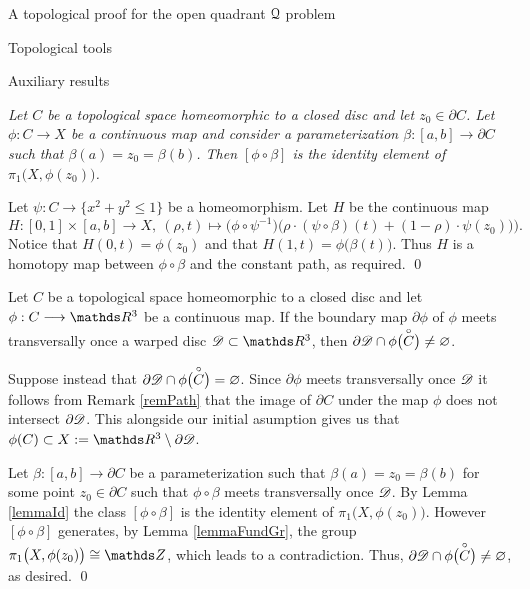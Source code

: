 \documentclass[11pt, a4paper, english, twoside, notitlepage, openright]{report}
\begin{document}
\begin{chapter}{A topological proof for the open quadrant $\mathcal{Q}$ problem}
\begin{section}{Topological tools}
\begin{subsection}{Auxiliary results}
\begin{lemma}\label{lemmaId} \em Let $C$ be a topological space homeomorphic to a closed disc and let $z_0\in\partial C$. Let $\phi:C\longrightarrow X$ be a continuous map and consider a parameterization $\beta:[a,b]\to\partial C$ such that $\beta(a)=z_0=\beta(b)$. Then $[\phi\circ\beta]$ is the identity element of $\pi_1\big(X,\phi(z_0)\big)$.\em
\begin{Proof} 
Let $\psi:C\to\{x^2+y^2\leq 1\}$ be a homeomorphism. Let $H$ be the continuous map
$$
H:[0,1]\times[a,b]\to X,\ (\rho,t)\mapsto\big(\phi\circ\psi^{-1}\big)\big(\rho\cdot(\psi\circ\beta)(t)+(1-\rho)\cdot\psi(z_0))\big).
$$
Notice that $H(0,t)=\phi(z_0)$ and that $H(1,t)=\phi\big(\beta(t)\big)$. Thus $H$ is a homotopy map between $\phi\circ\beta$ and the constant path, as required.
\qed
\end{Proof}
\end{lemma}

\begin{proposition}\label{propTop}
Let $C$ be a topological space homeomorphic to a closed disc and let $\phi:C\longrightarrow\R^3$ be a continuous map. If the boundary map $\partial\phi$ of $\phi$ meets transversally once a warped disc $\D\subset\R^3$, then $\partial\mathscr{D}\cap\phi\big(\overset{\circ}{C}\big)\neq\varnothing$.
\begin{Proof}
Suppose instead that $\partial\mathscr{D}\cap\phi\big(\overset{\circ}{C}\big)=\varnothing$. Since $\partial\phi$ meets transversally once $\mathscr{D}$ it follows from Remark \ref{remPath} that the image of $\partial C$ under the map $\phi$ does not intersect $\partial\mathscr{D}$. This alongside our initial asumption gives us that $\phi(C)\subset X:=\R^3\setminus\partial\D$.

\vspace{1mm}

Let $\beta:[a,b]\to\partial C$ be a parameterization such that $\beta(a)=z_0=\beta(b)$ for some point $z_0\in\partial C$ such that $\phi\circ\beta$ meets transversally once $\mathscr{D}$. By Lemma \ref{lemmaId} the class $[\phi\circ\beta]$ is the identity element of $\pi_1\big(X,\phi(z_0)\big)$. However $[\phi\circ\beta]$ generates, by Lemma \ref{lemmaFundGr}, the group $\pi_1\big(X,\phi(z_0)\big)\cong\Z$, which leads to a contradiction. Thus, $\partial\mathscr{D}\cap\phi\big(\overset{\circ}{C}\big)\neq\varnothing$, as desired.
\qed
\end{Proof}
\end{proposition}
\end{subsection}
\end{section}


\end{chapter}
\end{document}
